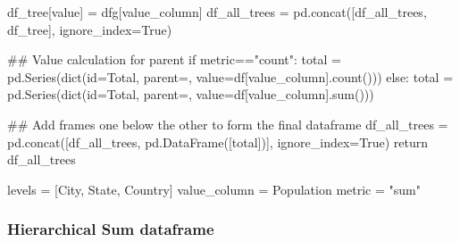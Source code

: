 \documentclass[
  letterpaper,
  DIV=11,
  numbers=noendperiod]{scrartcl}
\newenvironment{Shaded}{\begin{snugshade}}{\end{snugshade}}
\newcommand{\BuiltInTok}[1]{\textcolor[rgb]{0.00,0.23,0.31}{#1}}
\newcommand{\CommentTok}[1]{\textcolor[rgb]{0.37,0.37,0.37}{#1}}
\newcommand{\ControlFlowTok}[1]{\textcolor[rgb]{0.00,0.23,0.31}{#1}}
\newcommand{\NormalTok}[1]{\textcolor[rgb]{0.00,0.23,0.31}{#1}}
\newcommand{\OperatorTok}[1]{\textcolor[rgb]{0.37,0.37,0.37}{#1}}
\newcommand{\StringTok}[1]{\textcolor[rgb]{0.13,0.47,0.30}{#1}}
\newcommand{\VariableTok}[1]{\textcolor[rgb]{0.07,0.07,0.07}{#1}}
\begin{document}
\begin{Shaded}
\begin{Highlighting}[]
\NormalTok{        df\_tree[}\StringTok{\textquotesingle{}value\textquotesingle{}}\NormalTok{] }\OperatorTok{=}\NormalTok{ dfg[value\_column]}
\NormalTok{        df\_all\_trees }\OperatorTok{=}\NormalTok{ pd.concat([df\_all\_trees, df\_tree], ignore\_index}\OperatorTok{=}\VariableTok{True}\NormalTok{)}
    
    \CommentTok{\#\# Value calculation for parent }
    \ControlFlowTok{if}\NormalTok{ metric}\OperatorTok{==}\StringTok{"count"}\NormalTok{:}
\NormalTok{        total }\OperatorTok{=}\NormalTok{ pd.Series(}\BuiltInTok{dict}\NormalTok{(}\BuiltInTok{id}\OperatorTok{=}\StringTok{\textquotesingle{}Total\textquotesingle{}}\NormalTok{, parent}\OperatorTok{=}\StringTok{\textquotesingle{}\textquotesingle{}}\NormalTok{, value}\OperatorTok{=}\NormalTok{df[value\_column].count()))}
    \ControlFlowTok{else}\NormalTok{:}
\NormalTok{        total }\OperatorTok{=}\NormalTok{ pd.Series(}\BuiltInTok{dict}\NormalTok{(}\BuiltInTok{id}\OperatorTok{=}\StringTok{\textquotesingle{}Total\textquotesingle{}}\NormalTok{, parent}\OperatorTok{=}\StringTok{\textquotesingle{}\textquotesingle{}}\NormalTok{, value}\OperatorTok{=}\NormalTok{df[value\_column].}\BuiltInTok{sum}\NormalTok{()))}
    
    \CommentTok{\#\# Add frames one below the other to form the final dataframe}
\NormalTok{    df\_all\_trees }\OperatorTok{=}\NormalTok{ pd.concat([df\_all\_trees, pd.DataFrame([total])], ignore\_index}\OperatorTok{=}\VariableTok{True}\NormalTok{)}
    \ControlFlowTok{return}\NormalTok{ df\_all\_trees}
\end{Highlighting}
\end{Shaded}

\begin{Shaded}
\begin{Highlighting}[]
\NormalTok{levels }\OperatorTok{=}\NormalTok{ [}\StringTok{\textquotesingle{}City\textquotesingle{}}\NormalTok{, }\StringTok{\textquotesingle{}State\textquotesingle{}}\NormalTok{, }\StringTok{\textquotesingle{}Country\textquotesingle{}}\NormalTok{] }
\NormalTok{value\_column }\OperatorTok{=} \StringTok{\textquotesingle{}Population\textquotesingle{}}
\NormalTok{metric }\OperatorTok{=} \StringTok{"sum"}
\end{Highlighting}
\end{Shaded}

\hypertarget{hierarchical-sum-dataframe}{%
\subsubsection{Hierarchical Sum
dataframe}\label{hierarchical-sum-dataframe}}
\end{document}
